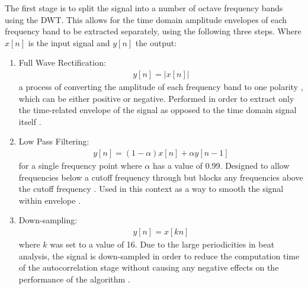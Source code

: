 \documentclass[a4paper, 11pt]{article}
\begin{document}
The first stage is to split the signal into a number of octave frequency bands using the DWT. This allows for the time domain amplitude envelopes of each frequency band to be extracted separately, using the following three steps. Where $x[n]$ is the input signal and $y[n]$ the output: 


\begin{enumerate}
\item Full Wave Rectification:
\begin{equation}
\begin{split}
y[n] = |x[n]|
\end{split}
\end{equation}
a process of converting the amplitude of each frequency band to one polarity \cite{pallas}, which can be either positive or negative. Performed in order to extract only the time-related envelope of the signal as opposed to the time domain signal itself \cite{tzane3}. 
\item Low Pass Filtering:
\begin{equation}
\begin{split}
y[n] = (1 - \alpha)x[n] + \alpha y[n - 1] 
\end{split}
\end{equation}
for a single frequency point where $\alpha$ has a value of 0.99. Designed to allow frequencies below a cutoff frequency through but blocks any frequencies above the cutoff frequency \cite{smith}. Used in this context as a way to smooth the signal within envelope \cite{tzane3}.
\item Down-sampling:
\begin{equation}
\begin{split}
y[n] = x[kn]
\end{split}
\end{equation}
where $k$ was set to a value of 16. Due to the large periodicities in beat analysis, the signal is down-sampled in order to reduce the computation time of the autocorrelation stage without causing any negative effects on the performance of the algorithm \cite{tzane3}.
\end{enumerate}
\end{document}
